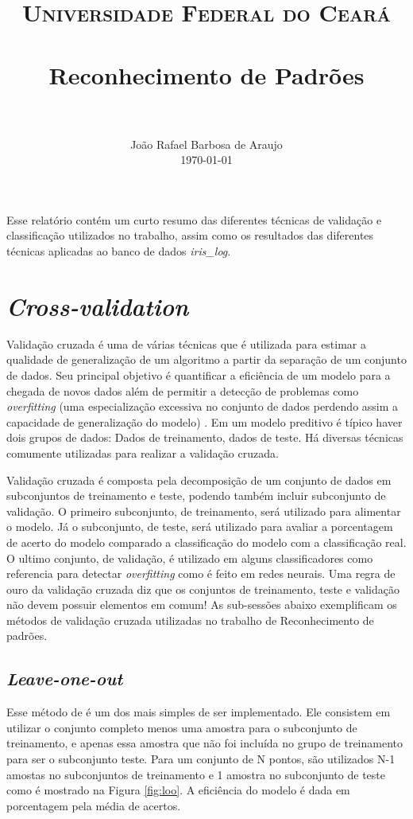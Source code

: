 \documentclass[paper=a4, fontsize=11pt]{scrartcl}
\title{
		\usefont{OT1}{bch}{b}{n}
		\normalfont \normalsize \textsc{Universidade Federal do Ceará} \\ [25pt]
		\horrule{0.5pt} \\[0.4cm]
		\huge Reconhecimento de Padrões \\
		\horrule{2pt} \\[0.5cm]
}
\author{
		\normalfont 								\normalsize
        João Rafael Barbosa de Araujo\\[-3pt]		\normalsize
        \today
}
\date{}
\numberwithin{equation}{section}		%
\numberwithin{figure}{section}			%
\numberwithin{table}{section}				%
\begin{document}
\maketitle

Esse relatório contém um curto resumo das diferentes técnicas de validação e classificação utilizados no trabalho, assim como os resultados das diferentes técnicas aplicadas ao banco de dados \textit{iris\_log}.

\section{\textit{Cross-validation}}

Validação cruzada é uma de várias técnicas que é utilizada para estimar a qualidade de generalização de um algoritmo a partir da separação de um conjunto de dados. Seu principal objetivo é quantificar a eficiência de um modelo para a chegada de novos dados além de permitir a detecção de problemas como \textit{overfitting} (uma especialização excessiva no conjunto de dados perdendo assim a capacidade de generalização do modelo) . Em um modelo preditivo é típico haver dois grupos de dados: Dados de treinamento, dados de teste. Há diversas técnicas comumente utilizadas para realizar a validação cruzada.

Validação cruzada é composta pela decomposição de um conjunto de dados em subconjuntos de treinamento e teste, podendo também incluir subconjunto de validação. O primeiro subconjunto, de treinamento, será utilizado para alimentar o modelo. Já o subconjunto, de teste, será utilizado para avaliar a porcentagem de acerto do modelo comparado a classificação do modelo com a classificação real. O ultimo conjunto, de validação, é utilizado em alguns classificadores como referencia para detectar \textit{overfitting} como é feito em redes neurais. Uma regra de ouro da validação cruzada diz que os conjuntos de treinamento, teste e validação não devem possuir elementos em comum! As sub-sessões abaixo exemplificam os métodos de validação cruzada utilizadas no trabalho de Reconhecimento de padrões.

\subsection{\textit{Leave-one-out}}
Esse método de é um dos mais simples de ser implementado. Ele consistem em utilizar o conjunto completo menos uma amostra para o subconjunto de treinamento, e apenas essa amostra que não foi incluída no grupo de treinamento para ser o subconjunto teste. Para um conjunto de N pontos, são utilizados N-1 amostas no subconjuntos de treinamento e 1 amostra no subconjunto de teste como é mostrado na Figura \ref{fig:loo}. A eficiência do modelo é dada em porcentagem pela média de acertos. 
\end{document}
